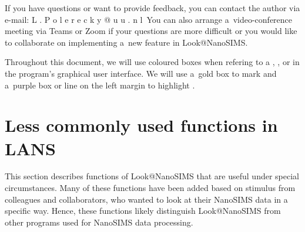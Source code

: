 \documentclass[a4paper, 11pt]{article}
\newcommand{\ttt}[1]{\textsf{#1}}
\newcounter{step}
\begin{document}
\vskip3mm
If you have questions or want to provide feedback, you can contact the author via e-mail: 
\vskip1mm
\hfill \ttt{L . P o l e r e c k y @ u u . n l}\hfill\
\vskip1mm\noindent You can also arrange a~video-conference meeting via Teams or Zoom if your questions are more difficult or you would like to collaborate on implementing a~new feature in Look@NanoSIMS.
\tcbe

\vskip3mm
Throughout this document, we will use coloured boxes when refering to a , ,  or  in the program's graphical user interface. We will use a~gold box to mark  and a~purple box or line on the left margin to highlight .
\tcbe

\cleardoublepage{}
\tableofcontents

\clearpage


\clearpage
\clearpage
\clearpage
\clearpage
\clearpage
\clearpage

\clearpage
\section{Less commonly used functions in LANS}
\label{sec:level3}

\purplebox{}
This section describes functions of Look@NanoSIMS that are useful under special circumstances. Many of these functions have been added based on stimulus from colleagues and collaborators, who wanted to look at their NanoSIMS data in a specific way. Hence, these functions likely distinguish Look@NanoSIMS from other programs used for NanoSIMS data processing.
\tcbe

\clearpage	%
\clearpage %
\clearpage %
\clearpage %

\clearpage %
\end{document}
